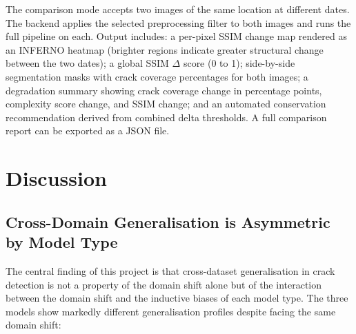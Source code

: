 \documentclass[12pt,a4paper]{article}
\begin{document}
The comparison mode accepts two images of the same location at different dates. The backend applies the selected preprocessing filter to both images and runs the full pipeline on each. Output includes: a per-pixel SSIM change map rendered as an INFERNO heatmap (brighter regions indicate greater structural change between the two dates); a global SSIM $\Delta$ score (0 to 1); side-by-side segmentation masks with crack coverage percentages for both images; a degradation summary showing crack coverage change in percentage points, complexity score change, and SSIM change; and an automated conservation recommendation derived from combined delta thresholds. A full comparison report can be exported as a JSON file.

\clearpage
\section{Discussion}

\subsection{Cross-Domain Generalisation is Asymmetric by Model Type}

The central finding of this project is that cross-dataset generalisation in crack detection is not a property of the domain shift alone but of the interaction between the domain shift and the inductive biases of each model type. The three models show markedly different generalisation profiles despite facing the same domain shift:
\end{document}
